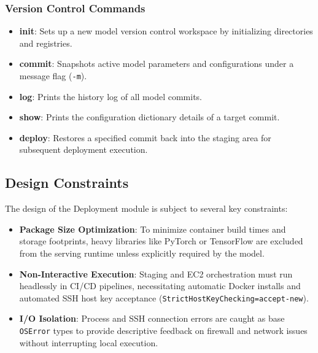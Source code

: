 \subsubsection{Version Control Commands}
\begin{itemize}[leftmargin=*]
  \item \textbf{init}: Sets up a new model version control workspace by initializing directories and registries.
  \item \textbf{commit}: Snapshots active model parameters and configurations under a message flag (\texttt{-m}).
  \item \textbf{log}: Prints the history log of all model commits.
  \item \textbf{show}: Prints the configuration dictionary details of a target commit.
  \item \textbf{deploy}: Restores a specified commit back into the staging area for subsequent deployment execution.
\end{itemize}

\subsection{Design Constraints}
\noindent The design of the Deployment module is subject to several key constraints:
\begin{itemize}[leftmargin=*]
  \item \textbf{Package Size Optimization}: To minimize container build times and storage footprints, heavy libraries like PyTorch or TensorFlow are excluded from the serving runtime unless explicitly required by the model.
  \item \textbf{Non-Interactive Execution}: Staging and EC2 orchestration must run headlessly in CI/CD pipelines, necessitating automatic Docker installs and automated SSH host key acceptance (\texttt{StrictHostKeyChecking=accept-new}).
  \item \textbf{I/O Isolation}: Process and SSH connection errors are caught as base \texttt{OSError} types to provide descriptive feedback on firewall and network issues without interrupting local execution.
\end{itemize}
